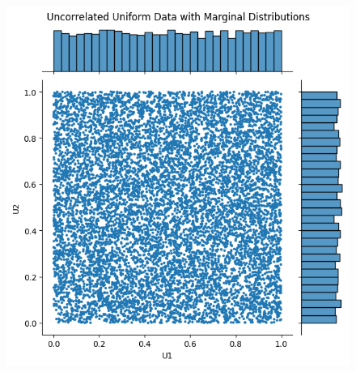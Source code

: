 \begin{figure}
\begin{minipage}{0.4\textwidth}
        \label{fig:CorrelatedScatter}
    \end{minipage}
    \vfill
    \begin{minipage}{0.4\textwidth}
        \centering
        \includegraphics[width=\textwidth]{3Theory/pictures/UncorrelatedUniformScatter.png}
        \label{fig:UncorrelatedUniformScatter}
    \end{minipage}
    \hfill
    \begin{minipage}{0.4\textwidth}
        \centering

\end{minipage}
\end{figure}
